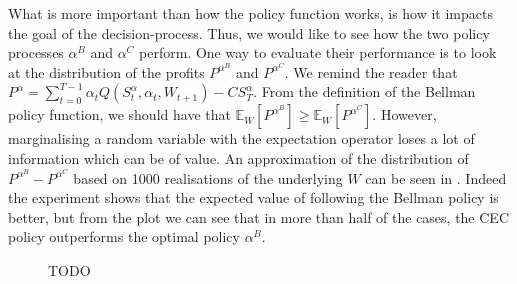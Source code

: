 \documentclass[main.tex]{subfiles}
\begin{document}
What is more important than how the policy function works, is how it
impacts the goal of the decision-process. Thus, we would like to see
how the two policy processes $\alpha^B$ and $\alpha^C$ perform.
One way to evaluate their performance is to look at
the distribution of the profits $P^{\alpha^B}$ and $P^{\alpha^C}$.
We remind the reader that
$P^\alpha =
\sum_{t=0}^{T-1}\alpha_tQ(S_t^\alpha,\alpha_t,W_{t+1})-CS_T^\alpha$.
From the definition of the Bellman policy function, we should have
that $\mathbb E_W[P^{\alpha^B}]\geq \mathbb E_W[P^{\alpha^C}]$.
However, marginalising a random variable with the expectation operator
loses a lot of information which can be of value.
An approximation of the distribution of
$P^{\alpha^B}-P^{\alpha^C}$ based on 1000 realisations of the
underlying $W$ can be seen in .
Indeed the experiment shows that the expected value of following the
Bellman policy is better, but from the plot we can see that
in more than half of the cases, the CEC policy outperforms the optimal
policy $\alpha^B$.
\begin{figure}[htbp]
  \centering
  \caption{TODO}\label{fig:bellman_det_vals}
\end{figure}

\end{document}
